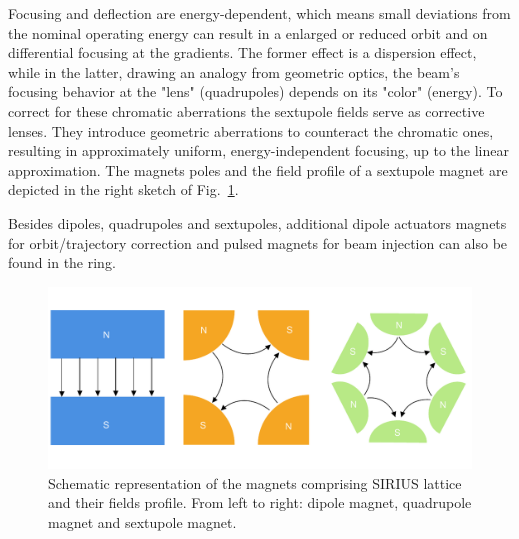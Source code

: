 Focusing and deflection are energy-dependent, which means small deviations from the nominal operating energy can result in a enlarged or reduced orbit and on differential focusing at the gradients. The former effect is a dispersion effect, while in the latter, drawing an analogy from geometric optics, the beam's focusing behavior at the "lens" (quadrupoles) depends on its "color" (energy). To correct for these chromatic aberrations the sextupole fields serve as corrective lenses. They introduce geometric aberrations to counteract the chromatic ones, resulting in approximately uniform, energy-independent focusing, up to the linear approximation. The magnets poles and the field profile of a sextupole magnet are depicted in the right sketch of Fig.~\ref{fig:magnets_fields}.

Besides dipoles, quadrupoles and sextupoles, additional dipole actuators magnets for orbit/trajectory correction and pulsed magnets for beam injection can also be found in the ring.
\begin{figure}[htb]
    \includegraphics[width=\textwidth]{Images/magnets.pdf}
    \caption[Schematic representation of the magnets comprising SIRIUS lattice and their fields profile.]{Schematic representation of the magnets comprising SIRIUS lattice and their fields profile. From left to right: dipole magnet, quadrupole magnet and sextupole magnet.}
    \label{fig:magnets_fields}
\end{figure}

